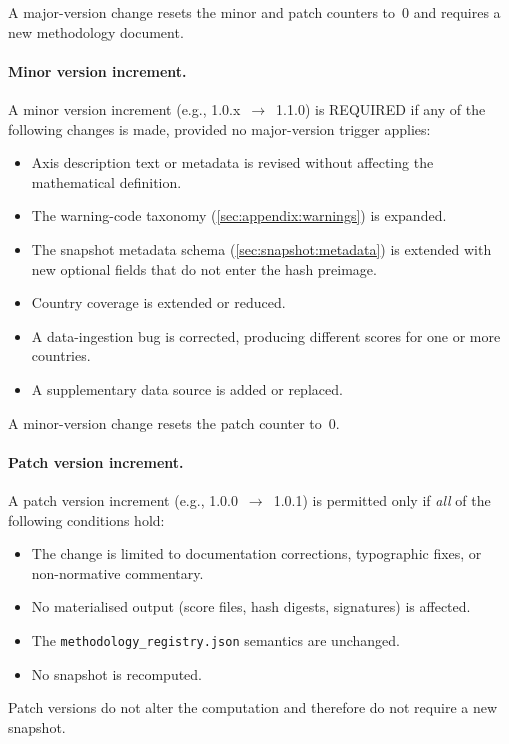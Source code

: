 A major-version change resets the minor and patch counters to~\(0\)
and requires a new methodology document.

\paragraph{Minor version increment.}
A minor version increment (e.g., 1.0.x~\(\to\)~1.1.0) is REQUIRED if
any of the following changes is made, provided no major-version trigger
applies:

\begin{itemize}
  \item Axis description text or metadata is revised without affecting
    the mathematical definition.
  \item The warning-code taxonomy (\cref{sec:appendix:warnings}) is expanded.
  \item The snapshot metadata schema (\cref{sec:snapshot:metadata}) is
    extended with new optional fields that do not enter the hash preimage.
  \item Country coverage is extended or reduced.
  \item A data-ingestion bug is corrected, producing different scores
    for one or more countries.
  \item A supplementary data source is added or replaced.
\end{itemize}

A minor-version change resets the patch counter to~\(0\).

\paragraph{Patch version increment.}
A patch version increment (e.g., 1.0.0~\(\to\)~1.0.1) is permitted
only if \emph{all} of the following conditions hold:

\begin{itemize}
  \item The change is limited to documentation corrections, typographic
    fixes, or non-normative commentary.
  \item No materialised output (score files, hash digests, signatures)
    is affected.
  \item The \texttt{methodology\_registry.json} semantics are unchanged.
  \item No snapshot is recomputed.
\end{itemize}

Patch versions do not alter the computation and therefore do not
require a new snapshot.


